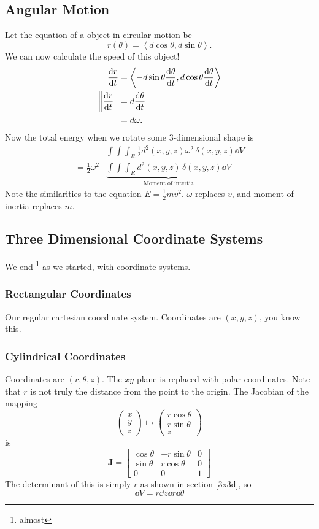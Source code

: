 \documentclass[12pt]{article}
\theoremstyle{plain} %
\theoremstyle{definition}
\theoremstyle{definition}
\theoremstyle{definition}
\theoremstyle{remark}
\newcommand{\half}{\frac{1}{2}}
\newcommand{\angled}[1]{\left\langle {#1} \right\rangle}
\renewcommand{\norm}[1]{\left\lVert#1\right\rVert}
\begin{document}
\subsection{Angular Motion}
Let the equation of a object in circular motion be
\[ r\left(\theta\right) = \angled{d\cos{\theta},d\sin{\theta}}.\]
We can now calculate the speed of this object!
\begin{align*}
    \dv{r}{t} &= \angled{-d\sin{\theta}\dv{\theta}{t},d\cos{\theta}\dv{\theta}{t}}\\
    \norm{\dv{r}{t}} &= d\dv{\theta}{t} \\ &= d\omega.
\end{align*}
Now the total energy when we rotate some $3$-dimensional shape is
\begin{align*}
    &\int\int\int_R \half d^2(x,y,z)\omega^2 \, \delta(x,y,z)\dd{V} \\
    = \half \omega^2 &\underbrace{\int\int\int_R d^2(x,y,z) \, \delta(x,y,z) \dd{V}}_{\text{Moment of intertia}}
\end{align*}
Note the similarities to the equation $E=\half mv^2$. $\omega$ replaces $v$, and moment of inertia replaces $m$.

\subsection{Three Dimensional Coordinate Systems}
We end \footnote{almost} as we started, with coordinate systems.
\subsubsection{Rectangular Coordinates}
Our regular cartesian coordinate system. Coordinates are $(x,y,z)$, you know this.

\subsubsection{Cylindrical Coordinates}
Coordinates are $(r,\theta,z)$. The $xy$ plane is replaced with polar coordinates. Note that $r$ is not truly the distance from the point to the origin. The Jacobian of the mapping
\[ \begin{pmatrix} x \\ y \\ z \end{pmatrix} \mapsto \begin{pmatrix} r\cos{\theta} \\ r\sin{\theta} \\ z \end{pmatrix} \]
is
\[ \mathbf{J} =
\begin{bmatrix}
    \cos{\theta} & -r\sin{\theta} & 0 \\
    \sin{\theta} & r\cos{\theta} & 0 \\
    0 & 0 & 1
\end{bmatrix} \]
The determinant of this is simply $r$ as shown in section \ref{3x3d}, so
\[ \dd{V} = r \dd{z} \dd{r} \dd{\theta} \]
\end{document}
